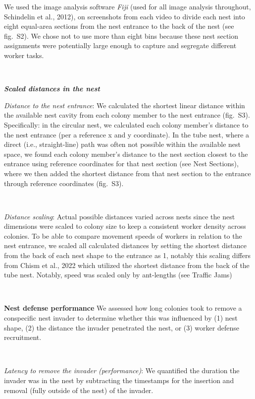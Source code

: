 \documentclass[3p]{elsarticle} %
\begin{document}
We used the image analysis software \emph{Fiji} (used for all image
analysis throughout, Schindelin et al., 2012), on screenshots from each
video to divide each nest into eight equal-area sections from the nest
entrance to the back of the nest (see fig.~S2). We chose not to use more
than eight bins because these nest section assignments were potentially
large enough to capture and segregate different worker tasks.

~

\textbf{\emph{Scaled distances in the nest}}

\emph{Distance to the nest entrance}: We calculated the shortest linear
distance within the available nest cavity from each colony member to the
nest entrance (fig.~S3). Specifically: in the circular nest, we
calculated each colony member's distance to the nest entrance (per a
reference x and y coordinate). In the tube nest, where a direct (i.e.,
straight-line) path was often not possible within the available nest
space, we found each colony member's distance to the nest section
closest to the entrance using reference coordinates for that nest
section (see Nest Sections), where we then added the shortest distance
from that nest section to the entrance through reference coordinates
(fig.~S3).

~

\emph{Distance scaling}: Actual possible distances varied across nests
since the nest dimensions were scaled to colony size to keep a
consistent worker density across colonies. To be able to compare
movement speeds of workers in relation to the nest entrance, we scaled
all calculated distances by setting the shortest distance from the back
of each nest shape to the entrance as 1, notably this scaling differs
from Chism et al., 2022 which utilized the shortest distance from the
back of the tube nest. Notably, speed was scaled only by ant-lengths
(see Traffic Jams)

~

\textbf{Nest defense performance} We assessed how long colonies took to
remove a conspecific nest invader to determine whether this was
influenced by (1) nest shape, (2) the distance the invader penetrated
the nest, or (3) worker defense recruitment.

~

\emph{Latency to remove the invader (performance)}: We quantified the
duration the invader was in the nest by subtracting the timestamps for
the insertion and removal (fully outside of the nest) of the invader.
\end{document}

